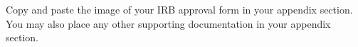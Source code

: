 Copy and paste the image of your IRB approval form in your appendix section.  You may also place any other supporting documentation in your appendix section.
